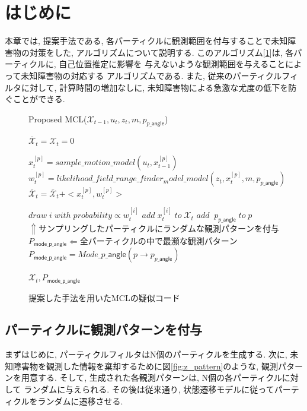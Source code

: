 \section{はじめに}
本章では, 提案手法である, 各パーティクルに観測範囲を付与することで未知障害物の対策をした, 
アルゴリズムについて説明する. 
このアルゴリズム[\ref{alg:proposed_mcl}]は, 各パーティクルに, 自己位置推定に影響を
与えないような観測範囲を与えることによって未知障害物の対応する
アルゴリズムである. 
また, 従来のパーティクルフィルタに対して, 
計算時間の増加なしに, 未知障害物による急激な尤度の低下を防ぐことができる. 

\begin{figure}[h]
  \begin{algorithm}[H]
      \caption{Proposed MCL($\mathcal{X}_{t-1}, u_t, z_t, m , p_{p\_\mathsf{angle}}$)}
      \label{alg:proposed_mcl}
      \begin{algorithmic}
      \STATE $\mathcal{\bar{X}}_t = \mathcal{X}_t = 0$

      \STATE $x_{t}^{[p]} = sample\_motion\_model(u_{t}, x_{t-1}^{[p]})$
      \STATE $w_{t}^{[p]} = likelihood\_field\_range\_finder_model\_model(z_{t}, x_{t}^{[p]}, m, p_{p\_\mathsf{angle}})$
      \STATE $\mathcal{\bar{X}}_t = \mathcal{\bar{X}}_t + <x_{t}^{[p]}, w_{t}^{[p]}>$
      \ENDFOR

      \STATE $draw\;i\;with\;probability \propto w_{t}^{[i]}$
      \STATE $add\; x_{t}^{[i]}\;to\;\mathcal{X}_t$
      \STATE $add\;\;p_{p\_\mathsf{angle}}\;to\;p$
      \STATE $\Uparrow サンプリングしたパーティクルにランダムな観測パターンを付与$
      \ENDFOR
      \STATE $P_\mathsf{mode\_p\_\mathsf{angle}} \Leftarrow 全パーティクルの中で最瀕な観測パターン$
      \STATE $P_\mathsf{mode\_p\_\mathsf{angle}} = Mode\_p\_\mathsf{angle}(p\rightarrow p_{p\_\mathsf{angle}})$
      \ENDFOR
      
      \RETURN $\mathcal{X}_t, P_\mathsf{mode\_p\_\mathsf{angle}}$
      \end{algorithmic}
  \end{algorithm}
  \caption{提案した手法を用いたMCLの疑似コード}
\end{figure}

\subsection{パーティクルに観測パターンを付与}
まずはじめに, パーティクルフィルタはN個のパーティクルを生成する. 
次に, 未知障害物を観測した情報を棄却するために図\ref{fig:z_pattern}のような, 
観測パターンを用意する. そして, 生成された各観測パターンは, N個の各パーティクルに対して
ランダムに与えられる. その後は従来通り, 状態遷移モデルに従ってパーティクルをランダムに遷移させる. 

